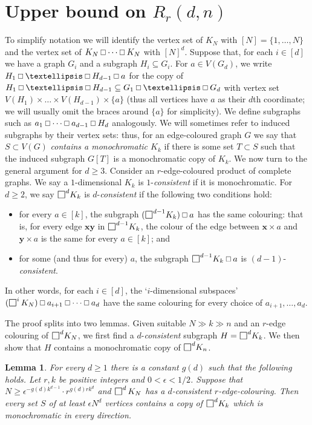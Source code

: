 \documentclass[10pt]{article}
\newtheorem{lemma}[theorem]{Lemma}
\DeclareMathOperator*{\ourbox}{\text{\raisebox{-0.25ex}{\scalebox{1.25}{$\square$}}}}
\newcommand\Osq{\mathbin{\text{\scalebox{.84}{$\square$}}}}
\begin{document}
\section{Upper bound on $R_r(d,n)$}\label{Sec:Rdn}
To simplify notation we will identify the vertex set of $K_N$ with $[N]=\{1,\dots,N\}$ and the vertex set of $K_N\Osq \cdots \Osq K_N$ with $[N]^d$.  Suppose that, for each $i\in[d]$ we have a graph $G_i$ and a subgraph $H_i\subseteq G_i$. For $a\in V(G_d)$,  we write $H_1\Osq\dots\Osq H_{d-1}\Osq a$ for the copy of $H_1\Osq\dots\Osq H_{d-1}\subseteq G_1\Osq\dots\Osq G_{d}$ with vertex set $V(H_1)\times\dots\times V(H_{d-1})\times \{a\}$ (thus all vertices have $a$ as their $d$th coordinate; we will usually omit the braces around $\{a\}$ for simplicity). We define subgraphs such as $a_1\Osq \cdots\Osq a_{d-1}\Osq H_{d}$ analogously.
We will sometimes refer to induced subgraphs by their vertex sets: thus, for an edge-coloured graph $G$ we  say that $S\subset V(G)$ {\em contains a monochromatic $K_k$} if there is some set $T\subset S$ such that the induced subgraph $G[T]$ is a monochromatic copy of $K_k$.
We now turn to the general argument for $d\ge3$.  Consider an 
$r$-edge-coloured product of complete graphs.  We say a $1$-dimensional $K_k$ is $1$-\textit{consistent} if it is monochromatic. For $d\geq 2$, we say $\ourbox^{d}\!K_k$ is $d$-\textit{consistent} if the following two conditions hold:
\begin{itemize}
\item for every $a\in [k]$, the subgraph $(\ourbox^{d-1}\!K_k)\Osq a$ has the same colouring: that is, for every edge $\textbf{x}\textbf{y}$ in $\ourbox^{d-1}\!K_k$, the colour of the edge between $\textbf{x}\times a$ and $\textbf{y}\times a$ is the same for every $a\in [k]$; and 
\item for some (and thus for every) $a$, the subgraph $\ourbox^{d-1}\!K_k\Osq a$ is $(d-1)$-\textit{consistent}. 
\end{itemize}
In other words, for each $i\in[d]$, the `$i$-dimensional subspaces' $(\ourbox^i K_N)\Osq a_{i+1}\Osq\cdots\Osq a_d$ have the same colouring for every choice of $a_{i+1},\dots,a_d$.

The proof splits into two lemmas. Given suitable $N\gg k\gg n$ and an $r$-edge colouring of $\ourbox^d\!K_N$, we first find a  $d$-\textit{consistent}  subgraph $H=\ourbox^{d}\!K_k$. We then show that $H$ contains a monochromatic copy of $\ourbox^{d}\!K_n$. 


\begin{lemma}\label{lem: 1}
For every $d\ge1$ there is a constant $g(d)$ such that the following holds.  Let $r,k$ be positive integers and $0<\epsilon<1/2$. Suppose that 
$N\geq \epsilon^{-g(d)k^{d-1}}\cdot r^{g(d)rk^{d}}$ and $\ourbox^d K_N$ has a $d$-consistent $r$-edge-colouring. Then every set $S$ of at least $\epsilon N^{d}$ vertices contains a copy of $\ourbox^{d}\!K_k$ which is monochromatic in every direction. 
\end{lemma}
\end{document}
